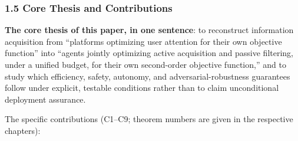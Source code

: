 \documentclass[
  11pt]{article}
\begin{document}
\subsubsection{1.5 Core Thesis and
Contributions}\label{core-thesis-and-contributions}

\textbf{The core thesis of this paper, in one sentence}: to reconstruct
information acquisition from ``platforms optimizing user attention for
their own objective function'' into ``agents jointly optimizing active
acquisition and passive filtering, under a unified budget, for their own
second-order objective function,'' and to study which efficiency,
safety, autonomy, and adversarial-robustness guarantees follow under
explicit, testable conditions rather than to claim unconditional
deployment assurance.

The specific contributions (C1--C9; theorem numbers are given in the
respective chapters):
\end{document}
